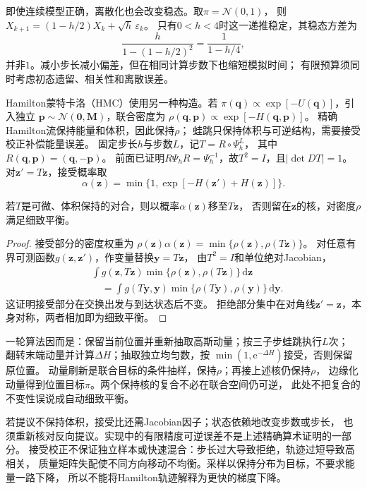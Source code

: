 即使连续模型正确，离散化也会改变稳态。取$\pi=\mathcal N(0,1)$，
则$X_{k+1}=(1-h/2)X_k+\sqrt h\,\varepsilon_k$。
只有$0<h<4$时这一递推稳定，其稳态方差为
\[
  \frac{h}{1-(1-h/2)^2}=\frac1{1-h/4},
\]
并非$1$。减小步长减小偏差，但在相同计算步数下也缩短模拟时间；
有限预算须同时考虑初态遗留、相关性和离散误差。

Hamilton蒙特卡洛（HMC）使用另一种构造。若
$\pi(\bm q)\propto\exp[-U(\bm q)]$，引入独立
$\bm p\sim\mathcal N(\bm0,\bm M)$，联合密度为
$\rho(\bm q,\bm p)\propto\exp[-H(\bm q,\bm p)]$。
精确Hamilton流保持能量和体积，因此保持$\rho$；
蛙跳只保持体积与可逆结构，需要接受校正补偿能量误差。
固定步长$h$与步数$L$，记$T=R\circ\Psi_h^L$，
其中$R(\bm q,\bm p)=(\bm q,-\bm p)$。
前面已证明$R\Psi_hR=\Psi_h^{-1}$，故$T^2=I$，且$|\det DT|=1$。
对$\bm z' =T\bm z$，接受概率取
\begin{equation}
 \alpha(\bm z)=\min\{1,\exp[-H(\bm z')+H(\bm z)]\}.
 \label{eq:dynamical-hmc-acceptance}
\end{equation}

\begin{theorem}[HMC提议的细致平衡]
 \label{thm:action-state-hmc-balance}
 若$T$是可微、体积保持的对合，则以概率$\alpha(\bm z)$移至$T\bm z$，
 否则留在$\bm z$的核，对密度$\rho$满足细致平衡。
\end{theorem}
\begin{proof}
 接受部分的密度权重为
 $\rho(\bm z)\alpha(\bm z)=\min\{\rho(\bm z),\rho(T\bm z)\}$。
 对任意有界可测函数$g(\bm z,\bm z')$，作变量替换$\bm y=T\bm z$，
 由$T^2=I$和单位绝对Jacobian，
 \[
 \begin{split}
 &\int g(\bm z,T\bm z)\min\{\rho(\bm z),\rho(T\bm z)\}\,\mathrm d\bm z\\
 &\quad=\int g(T\bm y,\bm y)
                   \min\{\rho(T\bm y),\rho(\bm y)\}\,\mathrm d\bm y .
 \end{split}
 \]
 这证明接受部分在交换出发与到达状态后不变。
 拒绝部分集中在对角线$\bm z'=\bm z$，本身对称，两者相加即为细致平衡。
\end{proof}

一轮算法因而是：保留当前位置并重新抽取高斯动量；按三子步蛙跳执行$L$次；
翻转末端动量并计算$\Delta H$；抽取独立均匀数，按
$\min(1,\mathrm e^{-\Delta H})$接受，否则保留原位置。
动量刷新是联合目标的条件抽样，保持$\rho$；再接上述核仍保持$\rho$，
边缘化动量得到位置目标$\pi$。两个保持核的复合不必在联合空间仍可逆，
此处不把复合的不变性误说成自动细致平衡。

若提议不保持体积，接受比还需Jacobian因子；状态依赖地改变步数或步长，
也须重新核对反向提议。实现中的有限精度可逆误差不是上述精确算术证明的一部分。
接受校正不保证独立样本或快速混合：步长过大导致拒绝，轨迹过短导致高相关，
质量矩阵失配使不同方向移动不均衡。采样以保持分布为目标，不要求能量一路下降，
所以不能将Hamilton轨迹解释为更快的梯度下降。

